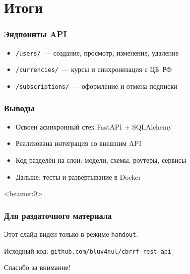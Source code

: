 \documentclass{beamer}
\begin{document}
\section{Итоги}

\begin{frame}
  \frametitle{Эндпоинты API}
  \begin{itemize}
    \item<1-> \texttt{/users/}~--- создание, просмотр, изменение, удаление
    \item<2-> \texttt{/currencies/}~--- курсы и синхронизация с ЦБ~РФ
    \item<3-> \texttt{/subscriptions/}~--- оформление и отмена подписки
  \end{itemize}

\end{frame}

\begin{frame}
  \frametitle{Выводы}
  \begin{itemize}[<+->]
    \item Освоен асинхронный стек FastAPI + SQLAlchemy
    \item Реализована интеграция со внешним API
    \item Код разделён на слои: модели, схемы, роутеры, сервисы
    \item \alert{Дальше:} тесты и развёртывание в Docker
  \end{itemize}
\end{frame}

\begin{frame}<beamer:0>
  \frametitle{Для раздаточного материала}
  Этот слайд виден только в режиме \texttt{handout}.

  Исходный код: \texttt{github.com/bluv4nul/cbrrf-rest-api}
\end{frame}

\begin{frame}
  \begin{center}
    \Huge Спасибо за внимание!
  \end{center}
\end{frame}
\end{document}
